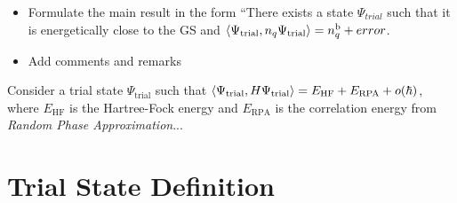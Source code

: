 \documentclass[12pt,a4paper]{article}
\numberwithin{equation}{section}
\newcommand{\1}{\mathbb{I}}
\renewcommand{\b}{\textnormal{b}}
\theoremstyle{plain}
\theoremstyle{definition}
\theoremstyle{remark}
\theoremstyle{plain}
\theoremstyle{definition}
\theoremstyle{remark}
\begin{document}
\begin{itemize}
\item Formulate the main result in the form ``There exists a state $ \Psi_{trial} $ such that it is energetically close to the GS and $ \langle \Psi_{\mathrm{trial}}, n_q \Psi_{\mathrm{trial}} \rangle = n_q^{\b} + error $.
\item Add comments and remarks
\end{itemize}

Consider a trial state $\Psi_{\mathrm{trial}}$ such that $\braket{\Psi_{\mathrm{trial}},H\Psi_{\mathrm{trial}}} = E_{\mathrm{HF}} + E_{\mathrm{RPA}}+ o(\hbar) $, where $E_{\mathrm{HF}}$ is the Hartree-Fock energy and $E_{\mathrm{RPA}}$ is the correlation energy from \textit{Random Phase Approximation}...




\section{Trial State Definition}
\label{sec:trialstate}
\end{document}
